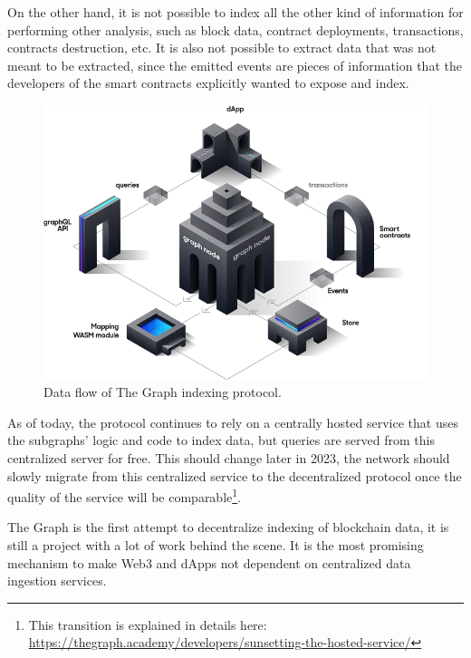 On the other hand, it is not possible to index all the other kind of information for performing other analysis, such as block data, contract deployments, transactions, contracts destruction, etc. It is also not possible to extract data that was not meant to be extracted, since the emitted events are pieces of information that the developers of the smart contracts explicitly wanted to expose and index. 

\begin{figure}[H]
  \centering
  \includegraphics[width=1\textwidth]{Figures/graph-dataflow.png}
  \caption[The Graph data flow]{Data flow of The Graph indexing protocol\protect\footnotemark.}
  \label{fig:the-graph-data-flow}
\end{figure}


As of today, the protocol continues to rely on a centrally hosted service that uses the subgraphs' logic and code to index data, but queries are served from this centralized server for free. This should change later in 2023, the network should slowly migrate from this centralized service to the decentralized protocol once the quality of the service will be comparable\footnote{This transition is explained in details here: \url{https://thegraph.academy/developers/sunsetting-the-hosted-service/}}.

The Graph is the first attempt to decentralize indexing of blockchain data, it is still a project with a lot of work behind the scene. It is the most promising mechanism to make Web3 and dApps not dependent on centralized data ingestion services.

